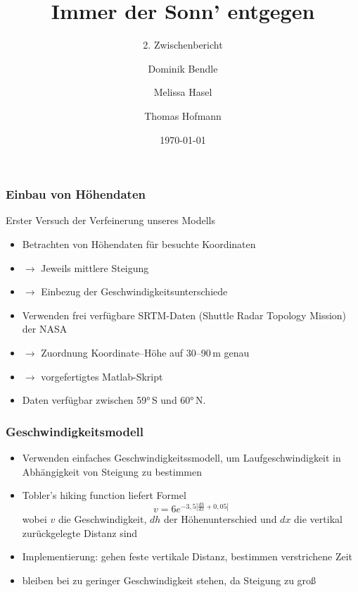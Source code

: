 \documentclass[aspectratio=43]{beamer}
\title{Immer der Sonn' entgegen}
\subtitle{2. Zwischenbericht}
\author{Dominik Bendle \and Melissa Hasel \and Thomas Hofmann}
\date{\today}
\institute{TU Kaiserslautern}
\begin{document}
\begin{frame}[plain]


\end{frame}

\begin{frame}
    \frametitle{Einbau von Höhendaten}
    Erster Versuch der Verfeinerung unseres Modells
    \begin{itemize}
        \item Betrachten von Höhendaten für besuchte Koordinaten
        \item[]$\rightarrow$ Jeweils mittlere Steigung
        \item[]$\rightarrow$ Einbezug der Geschwindigkeitsunterschiede
        \item Verwenden frei verfügbare SRTM-Daten (Shuttle Radar Topology Mission) der NASA
        \item[]$\rightarrow$ Zuordnung Koordinate--Höhe auf 30--90\,m genau
        \item[]$\rightarrow$ vorgefertigtes Matlab-Skript
        \item Daten verfügbar zwischen 59°\,S und 60°\,N.
    \end{itemize}
\end{frame}

\begin{frame}
    \frametitle{Geschwindigkeitsmodell}
    \begin{itemize}
        \item Verwenden einfaches Geschwindigkeitssmodell, um Laufgeschwindigkeit in
            Abhängigkeit von Steigung zu bestimmen
        \item Tobler's hiking function liefert Formel
            \begin{equation*}
                v = 6e^{-3{,}5 \left| \frac{d h}{d x} + 0{,}05\right|}
            \end{equation*}
            wobei $v$ die Geschwindigkeit, $dh$ der Höhenunterschied und $dx$ die
            vertikal zurückgelegte Distanz sind
        \item Implementierung: gehen feste vertikale Distanz, bestimmen verstrichene Zeit
        \item bleiben bei zu geringer Geschwindigkeit stehen, da Steigung zu groß
    \end{itemize}
\end{frame}
\end{document}
